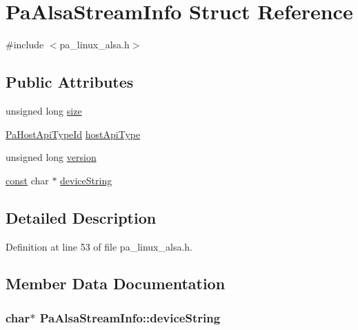 \hypertarget{struct_pa_alsa_stream_info}{}\section{Pa\+Alsa\+Stream\+Info Struct Reference}
\label{struct_pa_alsa_stream_info}


{\ttfamily \#include $<$pa\+\_\+linux\+\_\+alsa.\+h$>$}

\subsection*{Public Attributes}
\begin{DoxyCompactItemize}
\item 
unsigned long \hyperlink{struct_pa_alsa_stream_info_aef7d7bcb7ebeb75d78496cc4821bbb85}{size}
\item 
\hyperlink{portaudio_8h_a8eaebe3d39c5ea45598da8f86dc2e5ae}{Pa\+Host\+Api\+Type\+Id} \hyperlink{struct_pa_alsa_stream_info_a57cc8d7a4f599b88c1d05e974f3d3db8}{host\+Api\+Type}
\item 
unsigned long \hyperlink{struct_pa_alsa_stream_info_afb13c4ff1d97547735d7b19c1006b65c}{version}
\item 
\hyperlink{getopt1_8c_a2c212835823e3c54a8ab6d95c652660e}{const} char $\ast$ \hyperlink{struct_pa_alsa_stream_info_a442fbbb635cda0cece4e7af397d453f9}{device\+String}
\end{DoxyCompactItemize}


\subsection{Detailed Description}


Definition at line 53 of file pa\+\_\+linux\+\_\+alsa.\+h.



\subsection{Member Data Documentation}
\subsubsection[{\texorpdfstring{device\+String}{deviceString}}]{ char$\ast$ Pa\+Alsa\+Stream\+Info\+::device\+String}\hypertarget{struct_pa_alsa_stream_info_a442fbbb635cda0cece4e7af397d453f9}{}\label{struct_pa_alsa_stream_info_a442fbbb635cda0cece4e7af397d453f9}


